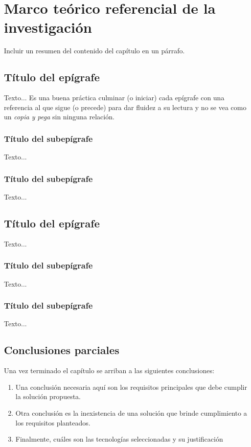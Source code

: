 \chapter{Marco teórico referencial de la investigación}\label{chap:1}

Incluir un resumen del contenido del capítulo en un párrafo.\\

\section{Título del epígrafe}

Texto... Es una buena práctica culminar (o iniciar) cada epígrafe con una referencia al que sigue (o precede) para dar fluidez a su lectura y no se vea como un \emph{copia y pega} sin ninguna relación.

\subsection{Título del subepígrafe}

Texto...

\subsection{Título del subepígrafe}

Texto...

\section{Título del epígrafe}

Texto...

\subsection{Título del subepígrafe}

Texto...

\subsection{Título del subepígrafe}

Texto...

\section{Conclusiones parciales}


Una vez terminado el capítulo se arriban a las siguientes conclusiones:

\begin{enumerate}
	\setlength\itemsep{0em}
	\item Una conclusión necesaria aquí son los requisitos principales que debe cumplir la solución propuesta.
	\item Otra conclusión es la inexistencia de una solución que brinde cumplimiento a los requisitos planteados.
	\item Finalmente, cuáles son las tecnologías seleccionadas y su justificación
\end{enumerate}

\pagebreak
